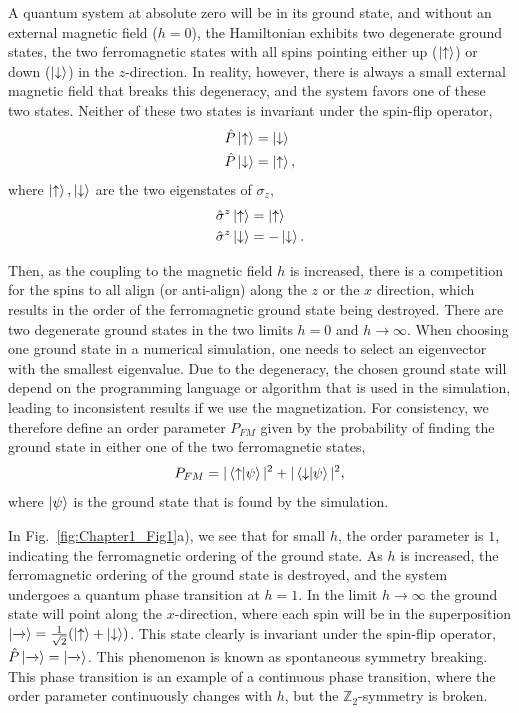 A quantum system at absolute zero will be in its ground state, and without an external magnetic field ($h = 0$), the Hamiltonian exhibits two degenerate ground states, the two ferromagnetic states with all spins pointing either up ($\ket{\uparrow}$) or down ($\ket{\downarrow}$) in the $z$-direction. In reality, however, there is always a small external magnetic field that breaks this degeneracy, and the system favors one of these two states. Neither of these two states is invariant under the spin-flip operator, 
\begin{align}
\begin{split}
    \hat{P}  \ket{\uparrow} & = \ket{\downarrow} \\
    \hat{P}  \ket{\downarrow} & = \ket{\uparrow},
\end{split}
\end{align}
where $\ket{\uparrow}, \ket{\downarrow}$ are the two eigenstates of $\sigma_z$,
\begin{align}
\begin{split}
    \hat{\sigma}^z \ket{\uparrow} & = \ket{\uparrow} \\
    \hat{\sigma}^z \ket{\downarrow} & = - \ket{\downarrow}.
\end{split}
\end{align}

Then, as the coupling to the magnetic field $h$ is increased, there is a competition for the spins to all align (or anti-align) along the $z$ or the $x$ direction, which results in the order of the ferromagnetic ground state being destroyed. There are two degenerate ground states in the two limits $h = 0$ and $h \to \infty$. When choosing one ground state in a numerical simulation, one needs to select an eigenvector with the smallest eigenvalue. Due to the degeneracy, the chosen ground state will depend on the programming language or algorithm that is used in the simulation, leading to inconsistent results if we use the magnetization. For consistency, we therefore define an order parameter $P_{FM}$ given by the probability of finding the ground state in either one of the two ferromagnetic states, 
\begin{equation}
    P_{FM} = |\braket{\uparrow}{\psi}|^2 + |\braket{\downarrow}{\psi}|^2, 
\end{equation}
where $\ket{\psi}$ is the ground state that is found by the simulation. 

In Fig.~\ref{fig:Chapter1_Fig1}a), we see that for small $h$, the order parameter is $1$, indicating the ferromagnetic ordering of the ground state. As $h$ is increased, the ferromagnetic ordering of the ground state is destroyed, and the system undergoes a quantum phase transition at $h = 1$. In the limit $h \to \infty$ the ground state will point along the $x$-direction, where each spin will be in the superposition $\ket{\xrightarrow{}} = \frac{1}{\sqrt{2}}(\ket{\uparrow}+\ket{\downarrow})$. This state clearly is invariant under the spin-flip operator, $\hat{P}  \ket{\xrightarrow{}} = \ket{\xrightarrow{}}$. This phenomenon is known as spontaneous symmetry breaking. This phase transition is an example of a continuous phase transition, where the order parameter continuously changes with $h$, but the $\mathbb{Z}_2$-symmetry is broken. 

